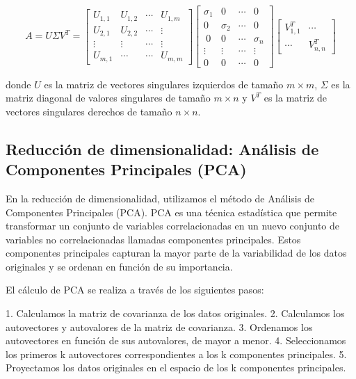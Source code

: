\documentclass[12pt,a4]{article} %
\begin{document}
\begin{equation}
    A = U \Sigma V^T= \begin{bmatrix}
    U_{1,1} & U_{1,2} & \cdots & U_{1,m} \\
    U_{2,1} & U_{2,2} & \cdots & \vdots \\
    \vdots & \vdots & \cdots & \vdots \\
    U_{m,1} & \cdots & \cdots & U_{m,m}
    \end{bmatrix}\begin{bmatrix}
    \sigma_1 & 0  &\cdots &0\\
    0 & \sigma_2  &\cdots &0\\\
    0 & 0 &\cdots &\sigma_ n\\
    \vdots & \vdots &\cdots &\vdots\\
    0&0&\cdots &0
    \end{bmatrix}\begin{bmatrix}
    V^{T}_{1,1} & \cdots \\
    \cdots & V^{T}_{n,n}
    \end{bmatrix}
    \label{svd}
\end{equation}




donde \(U\) es la matriz de vectores singulares izquierdos de tamaño \(m \times m\), \(\Sigma\) es la matriz diagonal de valores singulares de tamaño \(m \times n\) y \(V^T\) es la matriz de vectores singulares derechos de tamaño \(n \times n\).

\subsection{Reducción de dimensionalidad: Análisis de Componentes Principales (PCA)}
\label{PCA}
En la reducción de dimensionalidad, utilizamos el método de Análisis de Componentes Principales (PCA). PCA es una técnica estadística que permite transformar un conjunto de variables correlacionadas en un nuevo conjunto de variables no correlacionadas llamadas componentes principales. Estos componentes principales capturan la mayor parte de la variabilidad de los datos originales y se ordenan en función de su importancia.

El cálculo de PCA se realiza a través de los siguientes pasos:

1. Calculamos la matriz de covarianza de los datos originales.
2. Calculamos los autovectores y autovalores de la matriz de covarianza.
3. Ordenamos los autovectores en función de sus autovalores, de mayor a menor.
4. Seleccionamos los primeros k autovectores correspondientes a los k componentes principales.
5. Proyectamos los datos originales en el espacio de los k componentes principales.
\end{document}
